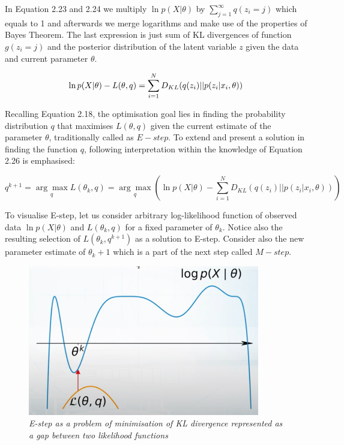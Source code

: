 In Equation 2.23 and 2.24 we multiply $\ln p(X|\theta)$ by $\sum_{j=1}^{\infty} q(z_i =j)$ which equals to 1 and afterwards we merge logarithms and make use of the properties of Bayes Theorem. 
The last expression is just sum of KL divergences of function $g(z_i = j)$ and the posterior distribution of the latent variable $z$ given the data and current parameter $\theta$. 

\begin{equation}
\ln p(X|\theta) - L(\theta, q) = \sum_{i=1}^{N} D_{KL} (q(z_i) || p(z_i|x_i,\theta)) \\
\end{equation}

Recalling Equation 2.18, the optimisation goal lies in finding the probability distribution $q$ that maximises $L(\theta, q)$ given the current estimate of the parameter $\theta$, traditionally called as $E-step$. To extend and present a solution in finding the function $q$, following interpretation within the knowledge of Equation 2.26 is emphasised:

\begin{equation}
q^{k+1} = \underset{q}{\arg\max} L(\theta_k, q) = \underset{q}{\arg\max} (\ln p(X|\theta)  - \sum_{i=1}^{N} D_{KL} (q(z_i) || p(z_i|x_i,\theta)))
\end{equation}

To visualise E-step, let us consider arbitrary log-likelihood function of observed data $\ln p(X|\theta)$ and $L(\theta_k,q)$ for a fixed parameter of $\theta_k$. Notice also the resulting selection of $L(\theta_k,q^{k+1})$ as a solution to E-step. Consider also the new parameter estimate of $\theta_k+1$ which is a part of the next step called $M-step$.

\begin{figure}[h]

\begin{center}
	\includegraphics[width=0.9\textwidth]{Loglike.png}
\end{center}

\caption{\textit{E-step as a problem of minimisation of KL divergence represented as a gap between two likelihood functions}}

\end{figure}

